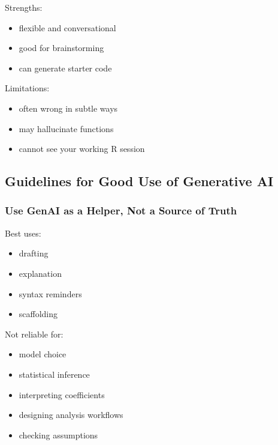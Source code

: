 \documentclass[
  letterpaper,
  8pt,
  a4paper]{book}
\providecommand{\tightlist}{%
  \setlength{\itemsep}{0pt}\setlength{\parskip}{0pt}}
\begin{document}
Strengths:

\begin{itemize}
\tightlist
\item
  flexible and conversational\\
\item
  good for brainstorming\\
\item
  can generate starter code
\end{itemize}

Limitations:

\begin{itemize}
\tightlist
\item
  often wrong in subtle ways\\
\item
  may hallucinate functions\\
\item
  cannot see your working R session
\end{itemize}

\subsection*{Guidelines for Good Use of Generative
AI}\label{guidelines-for-good-use-of-generative-ai}

\subsubsection*{Use GenAI as a Helper, Not a Source of
Truth}\label{use-genai-as-a-helper-not-a-source-of-truth}

Best uses:

\begin{itemize}
\tightlist
\item
  drafting\\
\item
  explanation\\
\item
  syntax reminders\\
\item
  scaffolding
\end{itemize}

Not reliable for:

\begin{itemize}
\tightlist
\item
  model choice\\
\item
  statistical inference\\
\item
  interpreting coefficients\\
\item
  designing analysis workflows\\
\item
  checking assumptions
\end{itemize}
\end{document}
